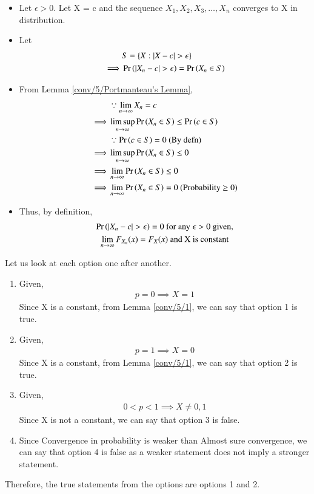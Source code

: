     \begin{itemize}
        \item Let $\epsilon > 0$. Let X = c and the sequence $X_1,X_2,X_3, \dots ,X_n$ converges to X in distribution.
        \item Let \begin{align}
            &S = \{X : |X - c| > \epsilon\} \\
            \implies &\pr{|X_n - c|>\epsilon} = \pr{X_ n\in S}
        \end{align}
        \item From Lemma \ref{conv/5/Portmanteau's Lemma}, 
        \begin{align}
           &\because \lim_{n \rightarrow \infty}X_n = c \\
            \implies &\limsup_{n \rightarrow \infty} \Pr\left(X_n \in S\right) \leq  \Pr\left(c \in S\right) \\
            &\because \Pr\left(c \in S\right) = 0 \text{ (By defn)} \\
            \implies &\limsup_{n \rightarrow \infty} \Pr\left(X_n \in S\right) \leq 0 \\
            \implies &\lim_{n \rightarrow \infty} \Pr\left(X_n \in S\right) \leq 0\\
            \implies &\lim_{n \rightarrow \infty} \Pr\left(X_n \in S\right) = 0 \text{ (Probability $\geq 0$)}
        \end{align}
        
        \item Thus, by definition,
        \begin{multline}
             \pr{|X_n-c|> \epsilon} = 0 \text{ for any }\epsilon > 0 \text{ given,} \\    
            \lim_{n \rightarrow \infty} F_{X_n}(x) = F_X(x)\text{ and X is constant}
        \end{multline}
    \end{itemize}
Let us look at each option one after another.
\begin{enumerate}
    \item Given,
    \begin{align}\nonumber
        p = 0 \implies X = 1
    \end{align}
    Since X is a constant, from Lemma \ref{conv/5/1}, we can say that option 1 is true.
    \item Given,
      \begin{align}\nonumber
        p = 1 \implies X = 0
    \end{align}
    Since X is a constant, from Lemma \ref{conv/5/1}, we can say that option 2 is true.
    \item Given,
      \begin{align}\nonumber
        0 < p < 1 \implies X \neq 0,1 
    \end{align}
    Since X is not a constant, we can say that option 3 is false.
    \item Since Convergence in probability is weaker than Almost sure convergence, we can say that option 4 is false as a weaker statement does not imply a stronger statement.
\end{enumerate}
Therefore, the true statements from the options are options 1 and 2.
